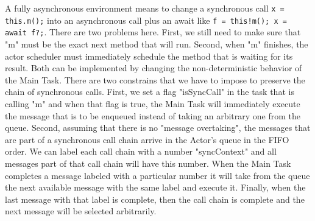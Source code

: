 \par A fully asynchronous environment means to change a synchronous call \texttt{x = this.m();} into an asynchronous call plus an await like \texttt{f = this!m();  x = await f?;}. There are two problems here. First, we still need to make sure that "m" must be the exact next method that will run. Second, when "m" finishes, the actor scheduler must immediately schedule the method that is waiting for its result. Both can be implemented by changing the non-deterministic behavior of the Main Task. There are two constrains that we have to impose to preserve the chain of synchronous calls. First, we set a flag "isSyncCall" in the task that is calling "m" and when that flag is true, the Main Task will immediately execute the message that is to be enqueued instead of taking an arbitrary one from the queue. Second, assuming that there is no "message overtaking", the messages that are part of a synchronous call chain arrive in the Actor's queue in the FIFO order. We can label each call chain with a number "syncContext" and all messages part of that call chain will have this number. When the Main Task completes a message labeled with a particular number it will take from the queue the next available message with the same label and execute it. Finally, when the last message with that label is complete, then the call chain is complete and the next message will be selected arbitrarily.

